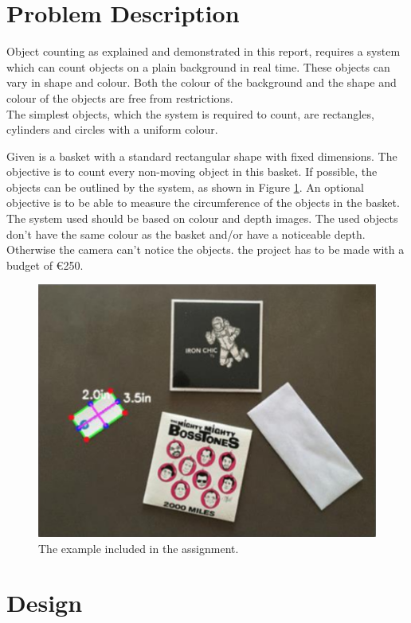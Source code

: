 \documentclass[11pt]{article}
\begin{document}
\section{Problem Description}

\hspace{\parindent} Object counting as explained and demonstrated in this report, requires a system which can count objects on a plain background in real time. These objects can vary in shape and colour. Both the colour of the background and the shape and colour of the objects are free from restrictions.\\
The simplest objects, which the system is required to count, are rectangles, cylinders and circles with a uniform colour.

\noindent Given is a basket with a standard rectangular shape with fixed dimensions. The objective is to count every non-moving object in this basket. If possible, the objects can be outlined by the system, as shown in Figure \ref{fig:example}. An optional objective is to be able to measure the circumference of the objects in the basket.\\

\noindent The system used should be based on colour and depth images. The used objects don't have the same colour as the basket and/or have a noticeable depth. Otherwise the camera can't notice the objects. the project has to be made with a budget of \euro 250.\\

\begin{figure}[h]
\centering
  \includegraphics[width=0.7\linewidth]{opdracht.png}
  \caption{The example included in the assignment.}
  \label{fig:example}
\end{figure}



\section{Design}
\end{document}
